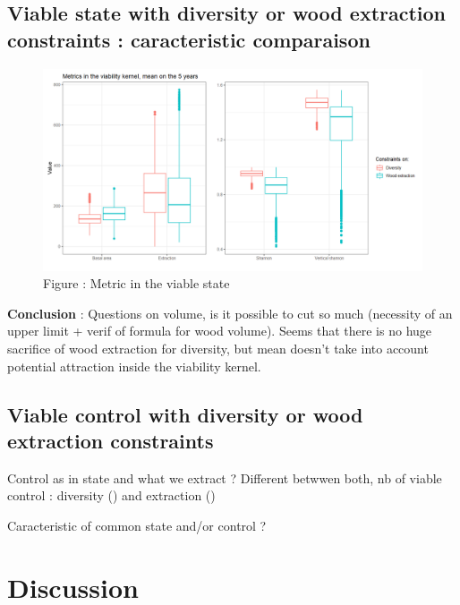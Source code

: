 \documentclass{article}
\begin{document}
\subsection{Viable state with diversity or wood extraction constraints : caracteristic comparaison}

\begin{figure}[h]
    \centering
    \includegraphics[width=\textwidth]{Figure/Viab_metric_mean.png}
    \caption{Figure : Metric in the viable state}
    \label{fig:Viab_metric_comp}
\end{figure}

\textbf{Conclusion} : Questions on volume, is it possible to cut so much (necessity of an upper limit + verif of formula for wood volume). Seems that there is no huge sacrifice of wood extraction for diversity, but mean doesn't take into account potential attraction inside the viability kernel.\\

\subsection{Viable control with diversity or wood extraction constraints}

Control as in state and what we extract ?
Different betwwen both, nb of viable control : diversity () and extraction ()

Caracteristic of common state and/or control ?\\

\section{Discussion}
\end{document}
